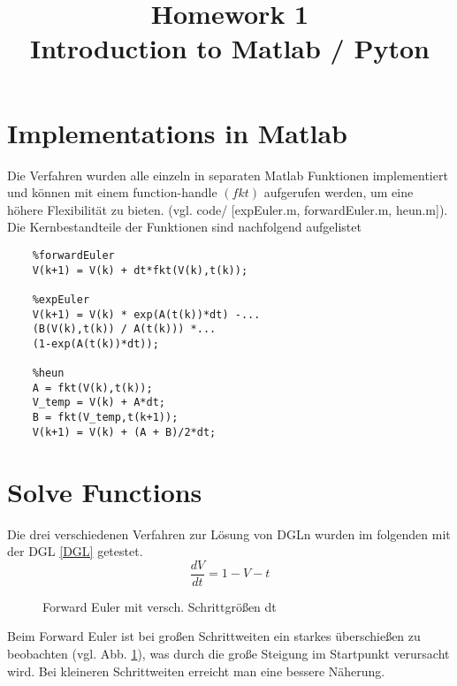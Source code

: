 \documentclass[conference]{IEEEtran}
\begin{document}
%
%
\title{Homework 1\\ Introduction to Matlab / Pyton}

\author{
}


\maketitle

\IEEEpeerreviewmaketitle

\section{Implementations in Matlab}
Die Verfahren wurden alle einzeln in separaten Matlab Funktionen implementiert und können mit einem function-handle $(fkt)$ aufgerufen werden, um eine höhere Flexibilität zu bieten. (vgl. code/ [expEuler.m, forwardEuler.m, heun.m]). Die Kernbestandteile der Funktionen sind nachfolgend aufgelistet

\begin{lstlisting}
	%forwardEuler 	
	V(k+1) = V(k) + dt*fkt(V(k),t(k));
	
	%expEuler		
	V(k+1) = V(k) * exp(A(t(k))*dt) -...
	(B(V(k),t(k)) / A(t(k))) *...
	(1-exp(A(t(k))*dt));
	
	%heun			
	A = fkt(V(k),t(k));
    V_temp = V(k) + A*dt;
    B = fkt(V_temp,t(k+1));
    V(k+1) = V(k) + (A + B)/2*dt;
\end{lstlisting}

\section{Solve Functions}
Die drei verschiedenen Verfahren zur Lösung von DGLn wurden im folgenden mit der DGL \eqref{DGL} getestet.
\begin{equation}
\frac{dV}{dt} = 1 - V - t
\label{DGL}
\end{equation}

\begin{figure}[h!]
  	\centering
    \scalebox{.6}{}
    \caption{Forward Euler mit versch. Schrittgrößen dt}
    \label{fig:forwardEuler}
\end{figure}
Beim Forward Euler ist bei großen Schrittweiten ein starkes überschießen zu beobachten (vgl. Abb. \ref{fig:forwardEuler}), was durch die große Steigung im Startpunkt verursacht wird. Bei kleineren Schrittweiten erreicht man eine bessere Näherung.
\end{document}

